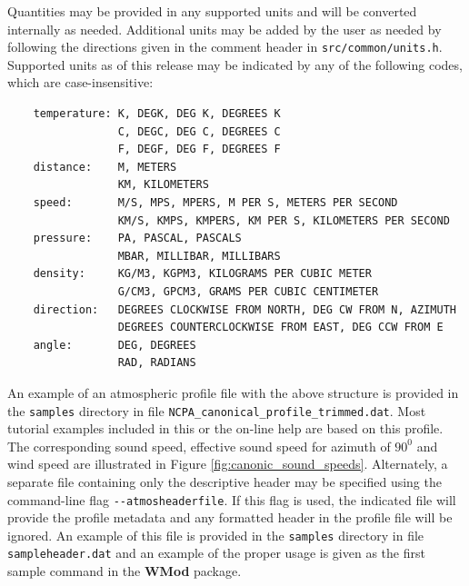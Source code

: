 Quantities may be provided in any supported units and will be converted internally as needed.  Additional units may be added by the user as needed by following the directions given in the comment header in \verb"src/common/units.h".  Supported units as of this release may be indicated by any of the following codes, which are case-insensitive:
\begin{verbatim}
    temperature: K, DEGK, DEG K, DEGREES K
                 C, DEGC, DEG C, DEGREES C
                 F, DEGF, DEG F, DEGREES F
    distance:    M, METERS
                 KM, KILOMETERS
    speed:       M/S, MPS, MPERS, M PER S, METERS PER SECOND
                 KM/S, KMPS, KMPERS, KM PER S, KILOMETERS PER SECOND
    pressure:    PA, PASCAL, PASCALS
                 MBAR, MILLIBAR, MILLIBARS
    density:     KG/M3, KGPM3, KILOGRAMS PER CUBIC METER
                 G/CM3, GPCM3, GRAMS PER CUBIC CENTIMETER
    direction:   DEGREES CLOCKWISE FROM NORTH, DEG CW FROM N, AZIMUTH
                 DEGREES COUNTERCLOCKWISE FROM EAST, DEG CCW FROM E
    angle:       DEG, DEGREES
                 RAD, RADIANS
\end{verbatim}

An example of an atmospheric profile file with the above structure is provided in the \verb"samples" directory in file \verb"NCPA_canonical_profile_trimmed.dat". Most tutorial examples included in this or the on-line help are based on this profile. The corresponding sound speed, effective sound speed for azimuth of $90^0$ and wind speed are illustrated in Figure \ref{fig:canonic_sound_speeds}.  Alternately, a separate file containing only the descriptive header may be specified using the command-line flag \verb"--atmosheaderfile".  If this flag is used, the indicated file will provide the profile metadata and any formatted header in the profile file will be ignored.  An example of this file is provided in the \verb"samples" directory in file \verb"sampleheader.dat" and an example of the proper usage is given as the first sample command in the {\bf WMod} package.

